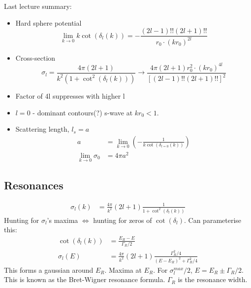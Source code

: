 \documentclass[a4paper, 11pt, normalem]{report}
\begin{document}
\chapter{}
Last lecture summary:
\begin{itemize}
    \item Hard sphere potential 
        \begin{equation}
            \lim_{k\to0} k\cot(\delta_l(k)) = -\frac{(2l-1)!!(2l+1)!!}{r_0\cdot(kr_0)^{2l}}
        \end{equation}
    \item Cross-section
        \begin{equation}
            \sigma_l = \frac{4\pi(2l+1)}{k^2(1+\cot^2(\delta_l(k)))} \to \frac{4\pi(2l+1)r_0^2\cdot(kr_0)^{4l}}{[(2l-1)!!(2l+1)!!]^2}
        \end{equation}
    \item Factor of 4l suppresses with higher l
    \item $l=0$ - dominant contours(?) s-wave at $kr_0 < 1$.
    \item Scattering length, $l_s = a$
        \begin{align}
            a &= \lim_{k\to0} \left(-\frac{1}{k\cot(\delta_{l=0}(k))}\right) \\
            \lim_{k\to0} \sigma_0 &= 4\pi a^2
        \end{align}
\end{itemize}

\section{Resonances}
\begin{align}
    \sigma_l(k) &= \frac{4\pi}{k^2}(2l+1)\frac{1}{1+\cot^2(\delta_l(k))}
\end{align}
Hunting for $\sigma_l$'s maxima $\iff$ hunting for zeros of $\cot(\delta_l)$.
Can parameterise this:
\begin{align}
    \cot(\delta_l(k)) &= \frac{E_R - E}{\Gamma_R/2} \\
    \sigma_l(E) &= \frac{4\pi}{k^2}(2l+1)\frac{\Gamma_R^2/4}{(E-E_R)^2+\Gamma_R^2/4}
\end{align}
This forms a gaussian around $E_R$.
Maxima at $E_R$. 
For $\sigma_l^{max}/2$, $E=E_R \pm \Gamma_R/2$.
This is known as the Bret-Wigner resonance formula.
$\Gamma_R$ is the resonance width.
\end{document}
